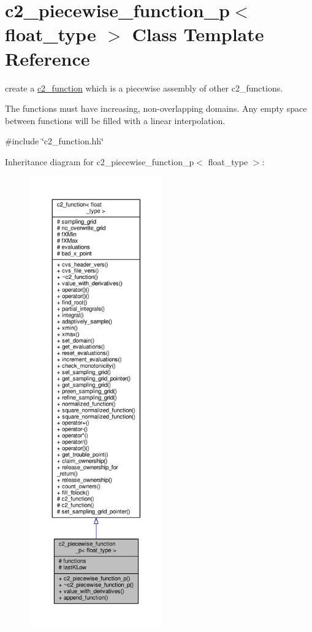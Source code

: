 \hypertarget{classc2__piecewise__function__p}{}\section{c2\+\_\+piecewise\+\_\+function\+\_\+p$<$ float\+\_\+type $>$ Class Template Reference}
\label{classc2__piecewise__function__p}


create a \hyperlink{classc2__function}{c2\+\_\+function} which is a piecewise assembly of other c2\+\_\+functions.

The functions must have increasing, non-\/overlapping domains. Any empty space between functions will be filled with a linear interpolation.  




{\ttfamily \#include \char`\"{}c2\+\_\+function.\+hh\char`\"{}}



Inheritance diagram for c2\+\_\+piecewise\+\_\+function\+\_\+p$<$ float\+\_\+type $>$\+:
\nopagebreak
\begin{figure}[H]
\begin{center}
\leavevmode
\includegraphics[height=550pt]{classc2__piecewise__function__p__inherit__graph}
\end{center}
\end{figure}


